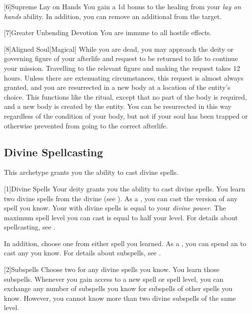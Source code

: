         [6]{Supreme Lay on Hands}
        You gain a \plus1d bonus to the healing from your \textit{lay on hands} ability.
        In addition, you can remove an additional  from the target.

        [7]{Greater Unbending Devotion}
        You are immune to all hostile  effects.

        [8]{Aligned Soul}[Magical]
        While you are dead, you may approach the deity or governing figure of your afterlife and request to be returned to life to continue your mission.
        Travelling to the relevant figure and making the request takes 12 hours.
        Unless there are extenuating circumstances, this request is almost always granted, and you are resurrected in a new body at a location of the entity's choice.
        This functions like the  ritual, except that no part of the body is required, and a new body is created by the entity.
        You can be resurrected in this way regardless of the condition of your body, but not if your soul has been trapped or otherwise prevented from going to the correct afterlife.

    \subsection{Divine Spellcasting}
        This archetype grants you the ability to cast divine spells.

        [1]{Divine Spells}
        Your deity grants you the ability to cast divine spells.
        You learn two divine spells from the divine  (see ).
        As a , you can cast the  version of any spell you know.
        Your  with divine spells is equal to your \textit{divine power}.
        The maximum spell level you can cast is equal to half your level.
        For details about spellcasting, see .

        In addition, choose one  from either spell you learned.
        As a , you can spend an  to cast any  you know.
        For details about subspells, see .

        [2]{Subspells} Choose two  for any divine spells you know.
        You learn those subspells.
        Whenever you gain access to a new spell or spell level, you can exchange any number of subspells you know for subspells of other spells you know.
        However, you cannot know more than two divine subspells of the same level.

